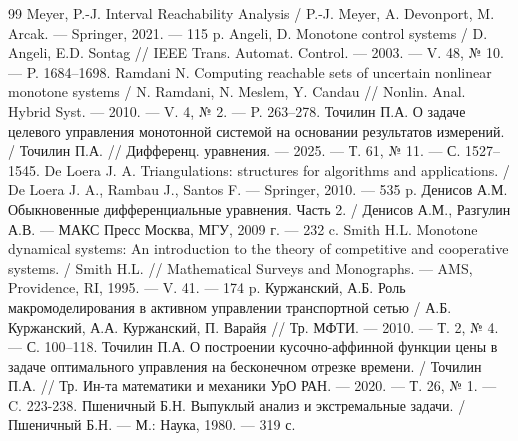 \documentclass{article}
\theoremstyle{definition}
\begin{document}
\begin{thebibliography}{99}
	 Meyer, P.-J. Interval Reachability Analysis / P.-J. Meyer, A. Devonport, M. Arcak. --- Springer, 2021. --- 115 p.
	 Angeli, D. Monotone control systems / D. Angeli, E.D. Sontag // IEEE Trans. Automat. Control. --- 2003. --- V. 48, № 10. — P. 1684–1698.
	 Ramdani N. Computing reachable sets of uncertain nonlinear monotone systems / N. Ramdani, N. Meslem, Y. Candau // Nonlin. Anal. Hybrid Syst. --- 2010. --- V. 4, № 2. --- P. 263–278.
	 Точилин П.А. О задаче целевого управления монотонной системой на основании результатов измерений. / Точилин П.А. // Дифференц. уравнения. --- 2025. --- Т. 61, № 11. --- С. 1527–1545.
	 De Loera J. A. Triangulations: structures for algorithms and applications. / De Loera J. A., Rambau J., Santos F. --- Springer, 2010. --- 535 p.
	 Денисов А.М. Обыкновенные дифференциальные уравнения. Часть 2. / Денисов А.М., Разгулин А.В. --- МАКС Пресс Москва, МГУ, 2009 г. --- 232 c.
	 Smith H.L. Monotone dynamical systems: An introduction to the theory of competitive and cooperative systems. / Smith H.L. // Mathematical Surveys and Monographs. --- AMS, Providence, RI, 1995. --- V. 41. --- 174 p.
	 Куржанский, А.Б. Роль макромоделирования в активном управлении транспортной сетью / А.Б. Куржанский, А.А. Куржанский, П. Варайя // Тр. МФТИ. --- 2010. --- Т. 2, № 4. --- С. 100–118.
	 Точилин П.А. О построении кусочно-аффинной функции цены в задаче оптимального управления на бесконечном отрезке времени. / Точилин П.А. // Тр. Ин-та математики и механики УрО РАН. --- 2020. --- Т. 26, № 1. --- C. 223-238.
	 Пшеничный Б.Н. Выпуклый анализ и экстремальные задачи. / Пшеничный Б.Н. --- М.: Наука, 1980. --- 319 с.
\end{thebibliography}
\end{document}
